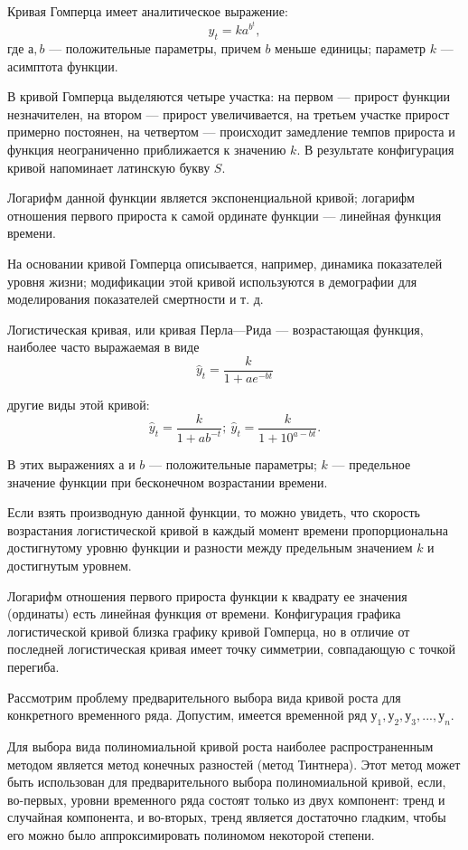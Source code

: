 Кривая Гомперца имеет аналитическое выражение:
\[ \hat{y}_t = ka^{b^t}, \]
где $а, b$ --- положительные параметры, причем $b$ меньше единицы; параметр $k$ --- асимптота функции.

В кривой Гомперца выделяются четыре участка: на первом --- прирост функции незначителен, на втором --- прирост увеличивается, на третьем участке прирост примерно постоянен, на четвертом --- происходит замедление темпов прироста и функция неограниченно приближается к значению $k$. В результате конфигурация кривой напоминает латинскую букву $S$.

Логарифм данной функции является экспоненциальной кривой; логарифм отношения первого прироста к самой ординате функции --- линейная функция времени.

На основании кривой Гомперца описывается, например, динамика показателей уровня жизни; модификации этой кривой используются в демографии для моделирования показателей смертности и т. д.

Логистическая кривая, или кривая Перла---Рида --- возрастающая функция, наиболее часто выражаемая в виде
\[ \hat{y}_t = \dfrac{k}{1 + ae^{-bt}} \]

другие виды этой кривой:
\[ \hat{y}_t = \dfrac{k}{1 + ab^{-t}};\  \hat{y}_t = \dfrac{k}{1 + 10^{a-bt}}. \]

В этих выражениях $а$ и $b$ --- положительные параметры; $k$ --- предельное значение функции при бесконечном возрастании времени.

Если взять производную данной функции, то можно увидеть, что скорость возрастания логистической кривой в каждый момент времени пропорциональна достигнутому уровню функции и разности между предельным значением $k$ и достигнутым уровнем.

Логарифм отношения первого прироста функции к квадрату ее значения (ординаты) есть линейная функция от времени.
Конфигурация графика логистической кривой близка графику кривой Гомперца, но в отличие от последней логистическая кривая имеет точку симметрии, совпадающую с точкой перегиба.

Рассмотрим проблему предварительного выбора вида кривой роста для конкретного временного ряда. Допустим, имеется временной ряд $у_1,у_2,у_3,...,у_n$.

Для выбора вида полиномиальной кривой роста наиболее распространенным методом является метод конечных разностей (метод Тинтнера). Этот метод может быть использован для предварительного выбора полиномиальной кривой, если, во-первых, уровни временного ряда состоят только из двух компонент: тренд и случайная компонента, и во-вторых, тренд является достаточно гладким, чтобы его можно было аппроксимировать полиномом некоторой степени.

